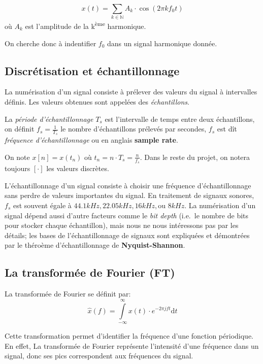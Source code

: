 \documentclass[]{article}
\begin{document}
\[ x(t) = \sum\limits_{k\in\mathbb{N}} A_k\cdot\cos(2\pi k f_0 t) \] où
\(A_k\) est l'amplitude de la k\textsuperscript{ème} harmonique.

On cherche donc à indentifier \(f_0\) dans un signal harmonique donnée.

\hypertarget{discretisation-et-echantillonnage}{%
\subsection{Discrétisation et
échantillonnage}\label{discretisation-et-echantillonnage}}

La numérisation d'un signal consiste à prélever des valeurs du signal à
intervalles définis. Les valeurs obtenues sont appelées des
\emph{échantillons}.

La \emph{période d'échantillonnage} \(T_s\) est l'intervalle de temps
entre deux échantillons, on définit \(f_s=\frac{1}{T_s}\) le nombre
d'échantillons prélevés par secondes, \(f_s\) est dît \emph{fréquence
d'échantillonnage} ou en anglais \textbf{sample rate}.

On note \(x[n] = x(t_n)\) où \(t_n = n\cdot T_s = \frac{n}{f_s}\). Dans
le reste du projet, on notera toujours \([\cdot]\) les valeurs
discrètes.

L'échantillonnage d'un signal consiste à choisir une fréquence
d'échantillonnage sans perdre de valeurs importantes du signal. En
traitement de signaux sonores, \(f_s\) est souvent égale à
\(44.1 kHz, 22.05 kHz, 16 kHz,\text{ou } 8kHz\). La numérisation d'un
signal dépend aussi d'autre facteurs comme le \emph{bit depth} (i.e.~le
nombre de bits pour stocker chaque échantillon), mais nous ne nous
intéressons pas par les détails; les bases de l'échantillonnage de
signaux sont expliquées et démontrées par le théroème d'échantillonnage
de \textbf{Nyquist-Shannon}.

\hypertarget{la-transformee-de-fourier-ft}{%
\subsection{La transformée de Fourier
(FT)}\label{la-transformee-de-fourier-ft}}

La transformée de Fourier se définit par:
\[\hat{x}(f) = \int\limits_{-\infty}^{\infty} x(t)\cdot e^{-2\pi j ft}\mathrm{d}t\]

Cette transformation permet d'identifier la fréquence d'une fonction
périodique. En effet, La transformée de Fourier représente l'intensité
d'une fréquence dans un signal, donc ses pics correspondent aux
fréquences du signal.
\end{document}
